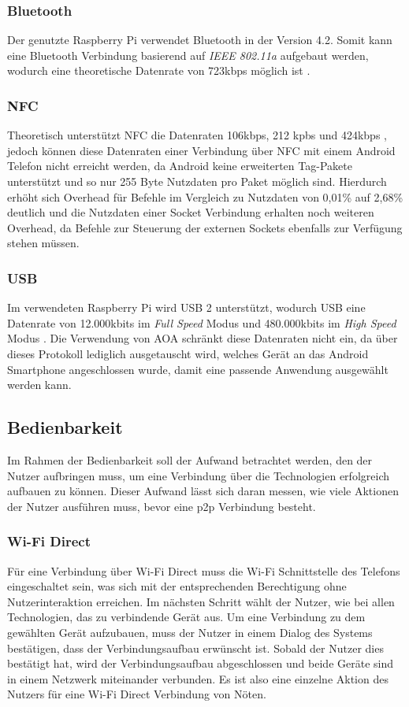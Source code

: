 		\subsubsection{Bluetooth} Der genutzte Raspberry Pi verwendet Bluetooth in der Version 4.2. Somit kann eine Bluetooth Verbindung basierend auf {\it IEEE 802.11a} aufgebaut werden, wodurch eine theoretische Datenrate von 723kbps möglich ist \cite[S.377]{Sauter}.
		
		\subsubsection{NFC} Theoretisch unterstützt NFC die Datenraten 106kbps, 212 kpbs und 424kbps \linebreak \cite{nfcRates}, jedoch können diese Datenraten einer Verbindung über NFC mit einem Android Telefon nicht erreicht werden, da Android keine erweiterten Tag-Pakete unterstützt \cite{nfcBug} und so nur 255 Byte Nutzdaten pro Paket möglich sind. Hierdurch erhöht sich Overhead für Befehle im Vergleich zu Nutzdaten von 0,01\% auf 2,68\% deutlich und die Nutzdaten einer Socket Verbindung erhalten noch weiteren Overhead, da Befehle zur Steuerung der externen Sockets ebenfalls zur Verfügung stehen müssen.
		
		\subsubsection{USB} Im verwendeten Raspberry Pi wird USB 2 unterstützt, wodurch USB eine Datenrate von 12.000kbits im {\it Full Speed} Modus und 480.000kbits im {\it High Speed} Modus \cite[S.36]{axelson}. Die Verwendung von AOA schränkt diese Datenraten nicht ein, da über dieses Protokoll lediglich ausgetauscht wird, welches Gerät an das Android Smartphone angeschlossen wurde, damit eine passende Anwendung ausgewählt werden kann.
		
		\subsection{Bedienbarkeit}
      Im Rahmen der Bedienbarkeit soll der Aufwand betrachtet werden, den der Nutzer aufbringen muss, um eine Verbindung über die Technologien erfolgreich aufbauen zu können. Dieser Aufwand lässt sich daran messen, wie viele Aktionen der Nutzer ausführen muss, bevor eine p2p Verbindung besteht.
      
		\subsubsection{Wi-Fi Direct} Für eine Verbindung über Wi-Fi Direct muss die Wi-Fi Schnittstelle des Telefons eingeschaltet sein, was sich mit der entsprechenden Berechtigung ohne Nutzerinteraktion erreichen. Im nächsten Schritt wählt der Nutzer, wie bei allen Technologien, das zu verbindende Gerät aus. Um eine Verbindung zu dem gewählten Gerät aufzubauen, muss der Nutzer in einem Dialog des Systems bestätigen, dass der Verbindungsaufbau erwünscht ist. Sobald der Nutzer dies bestätigt hat, wird der Verbindungsaufbau abgeschlossen und beide Geräte sind in einem Netzwerk miteinander verbunden. Es ist also eine einzelne Aktion des Nutzers für eine Wi-Fi Direct Verbindung von Nöten.
		
